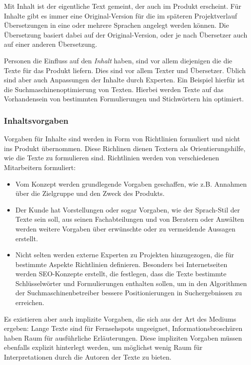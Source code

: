 Mit Inhalt ist der eigentliche Text gemeint, der auch im Produkt erscheint. Für Inhalte gibt es immer eine Original-Version für die im späteren Projektverlauf Übersetzungen in eine oder mehrere Sprachen angelegt werden können. Die Übersetzung basiert dabei auf der Original-Version, oder je nach Übersetzer auch auf einer anderen Übersetzung.

Personen die Einfluss auf den \emph{Inhalt} haben, sind vor allem diejenigen die die Texte für das Produkt liefern. Dies sind vor allem Texter und Übersetzer. Üblich sind aber auch Anpassungen der Inhalte durch Experten. Ein Beispiel hierfür ist die Suchmaschinenoptimierung von Texten. Hierbei werden Texte auf das Vorhandensein von bestimmten Formulierungen und Stichwörtern hin optimiert. 

\subsubsection{Inhaltsvorgaben}

Vorgaben für Inhalte sind werden in Form von Richtlinien formuliert und nicht ins Produkt übernommen. Diese Richlinen dienen Textern als Orientierungshilfe, wie die Texte zu formulieren sind. Richtlinien werden von verschiedenen Mitarbeitern formuliert: 
\begin{itemize}\itemsep -5pt
\item Vom Konzept werden grundlegende Vorgaben geschaffen, wie z.B. Annahmen über die Zielgruppe und den Zweck des Produkts.
\item Der Kunde hat Vorstellungen oder sogar Vorgaben, wie der Sprach-Stil der Texte sein soll, aus seinen Fachabteilungen und von Beratern oder Anwälten werden weitere Vorgaben über erwünschte oder zu vermeidende Aussagen erstellt.
\item Nicht selten werden externe Experten zu Projekten hinzugezogen, die für bestimmte Aspekte Richtlinien definieren. Besonders bei Internetseiten werden SEO-Konzepte erstellt, die festlegen, dass die Texte bestimmte Schlüsselwörter und Formulierungen enthalten sollen, um in den Algorithmen der Suchmaschinenbetreiber bessere Positionierungen in Suchergebnissen zu erreichen.
\end{itemize}
Es existieren aber auch implizite Vorgaben, die sich aus der Art des Mediums ergeben: Lange Texte sind für Fernsehspots ungeeignet, Informationsbroschüren haben Raum für ausführliche Erläuterungen. Diese impliziten Vorgaben müssen ebenfalls explizit hinterlegt werden, um möglichst wenig Raum für Interpretationen durch die Autoren der Texte zu bieten.

